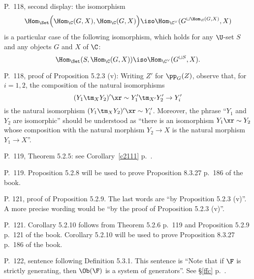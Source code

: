 \documentclass[12pt]{article}
\theoremstyle{remark}
\theoremstyle{definition}
\begin{document}
%

\begin{s}
P.~118, second display: the isomorphism 
$$
\Hom_{\Set}\Big(\Hom_\C(G,X),\Hom_\C(G,X)\Big)\iso\Hom_{\C^\vee}(G^{\sqcup\Hom_\C(G,X)},X)
$$ 
is a particular case of the following isomorphism, which holds for any $\U$-set $S$ and any objects $G$ and $X$ of $\C$: 
$$
\Hom_{\Set}(S,\Hom_\C(G,X))\iso\Hom_{\C^\vee}(G^{\sqcup S},X).
$$ 
\end{s}

%

\begin{s}
P.~118, proof of Proposition 5.2.3 (v): %
Writing $Z'$ for $\pp_G(Z)$, observe that, for $i=1,2$, the composition of the natural isomorphisms 
$$
(Y_1\tm_XY_2)'\xr\sim Y'_1\tm_{X'}Y'_2\to Y'_i
$$ 
is the natural isomorphism $(Y_1\tm_XY_2)'\xr\sim Y'_i$. Moreover, the phrase ``$Y_1$ and $Y_2$ are isomorphic'' should be understood as ``there is an isomorphism $Y_1\xr\sim Y_2$ whose composition with the natural morphism $Y_2\to X$ is the natural morphism $Y_1\to X$''.
\end{s} 

%

\begin{s}
P.~119, Theorem 5.2.5: see Corollary~\ref{c2111} p.~.
\end{s}

%

\begin{s}
P.~119. Proposition 5.2.8 will be used to prove Proposition 8.3.27 p.~186 of the book.
\end{s}

%

\begin{s}
P. 121, proof of Proposition 5.2.9. The last words are ``by Proposition 5.2.3 (v)''. A more precise wording would be ``by the proof of Proposition 5.2.3 (v)''.
\end{s}

%

\begin{s}
P.~121. Corollary 5.2.10 follows from Theorem 5.2.6 p.~119 and Proposition 5.2.9 p.~121 of the book. Corollary 5.2.10 will be used to prove Proposition 8.3.27 p.~186 of the book.
\end{s}

%

\begin{s}
P.~122, sentence following Definition 5.3.1. This sentence is ``Note that if $\F$ is strictly generating, then $\Ob(\F)$ is a system of generators''. See \S\ref{ffc} p.~. 
\end{s}  
\end{document}
